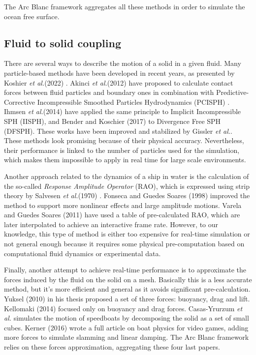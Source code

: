 \documentclass[11pt]{article}
\def\Framework{The Arc Blanc framework\xspace}
\def\etal{\emph{et al.}\xspace}
\begin{document}
\Framework aggregates all these methods in order to simulate the ocean free surface.
\subsection{Fluid to solid coupling}
\label{subsubsec:fluidToSolidCoupling}
There are several ways to describe the motion of a solid in a given fluid.
Many particle-based methods have been developed in recent years, as presented by Koshier \etal (2022) \cite{koschierSurveySPHMethods2022}.
Akinci \etal (2012) \cite{akinciVersatileRigidfluidCoupling2012} have proposed to calculate contact forces between fluid particles and boundary ones in combination with Predictive-Corrective Incompressible Smoothed Particles Hydrodynamics (PCISPH) \cite{solenthalerPredictivecorrectiveIncompressibleSPH2009}.
Ihmsen \etal (2014) \cite{ihmsenImplicitIncompressibleSPH2014} have applied the same principle to Implicit Incompressible SPH (IISPH), and Bender and Koschier (2017) \cite{benderDivergenceFreeSPHIncompressible2017} to Divergence Free SPH (DFSPH).
These works have been improved and stabilized by Gissler  \etal \cite{gisslerInterlinkedSPHPressure2019}.
These methods look promising because of their physical accuracy.
Nevertheless, their performance is linked to the number of particles used for the simulation, which makes them impossible to apply in real time for large scale environments.

Another approach related to the dynamics of a ship in water is the calculation of the so-called \emph{Response Amplitude Operator} (RAO), which is expressed using strip theory by Salvesen \etal (1970) \cite{salvesenShipMotionsSea1970}. Fonseca and Guedes Soares (1998) \cite{fonsecaTimeDomainAnalysisLargeAmplitude1998} improved the method to support more nonlinear effects and large amplitude motions. Varela and Guedes Soares (2011) \cite{varelaInteractiveSimulationShip2011} have used a table of pre-calculated RAO, which are later interpolated to achieve an interactive frame rate.
However, to our knowledge, this type of method is either too expensive for real-time simulation or not general enough because it requires some physical pre-computation based on computational fluid dynamics or experimental data.

Finally, another attempt to achieve real-time performance is to approximate the forces induced by the fluid on the solid on a mesh.
Basically this is a less accurate method, but it's more efficient and general as it avoids significant pre-calculation.
Yuksel (2010) \cite{yukselRealtimeWaterWaves2010} in his thesis proposed a set of three forces: buoyancy, drag and lift.
Kellomaki (2014) \cite{kellomakiRigidBodyInteraction2014} focused only on buoyancy and drag forces.
Casas-Yrurzum \etal \cite{casas-yrurzumRealtimePhysicsSimulation2012a} simulates the motion of speedboats by decomposing the solid as a set of small cubes.
Kerner (2016) \cite{kernerWaterInteractionModel2016} wrote a full article on boat physics for video games, adding more forces to simulate slamming and linear damping.
\Framework relies on these forces approximation, aggregating these four last papers.
\end{document}
